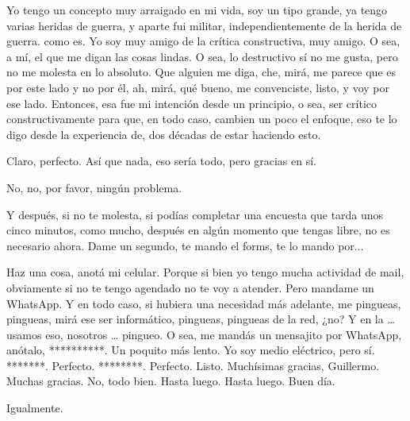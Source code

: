 \begin{description}[leftmargin=0cm, labelsep=0.5cm]
    \item[\textbf{PITA GUILLERMO:}] Yo tengo un concepto muy arraigado en mi vida, soy un tipo grande, ya tengo varias heridas de guerra, y aparte fui militar, independientemente de la herida de guerra. como es. Yo soy muy amigo de la crítica constructiva, muy amigo. O sea, a mí, el que me digan las cosas lindas. O sea, lo destructivo sí no me gusta, pero no me molesta en lo absoluto. Que alguien me diga, che, mirá, me parece que es por este lado y no por él, ah, mirá, qué bueno, me convenciste, listo, y voy por ese lado. Entonces, esa fue mi intención desde un principio, o sea, ser crítico constructivamente para que, en todo caso, cambien un poco el enfoque, eso te lo digo desde la experiencia de, dos décadas de estar haciendo esto.

    \item[\textbf{MUNTAABSKI FEDERICO:}] Claro, perfecto. Así que nada, eso sería todo, pero gracias en sí.

    \item[\textbf{PITA GUILLERMO:}] No, no, por favor, ningún problema.

    \item[\textbf{MUNTAABSKI FEDERICO:}] Y después, si no te molesta, si podías completar una encuesta que tarda unos cinco minutos, como mucho, después en algún momento que tengas libre, no es necesario ahora. Dame un segundo, te mando el forms, te lo mando por...

    \item[\textbf{PITA GUILLERMO:}] Haz una cosa, anotá mi celular. Porque si bien yo tengo mucha actividad de mail, obviamente si no te tengo agendado no te voy a atender. Pero mandame un WhatsApp. Y en todo caso, si hubiera una necesidad más adelante, me pingueas, pingueas, mirá ese ser informático, pingueas, pingueas de la red, ¿no? Y en la … usamos eso, nosotros … pingueo. O sea, me mandás un mensajito por WhatsApp, anótalo, **********. Un poquito más lento. Yo soy medio eléctrico, pero sí. *******. Perfecto. ********. Perfecto. Listo. Muchísimas gracias, Guillermo. Muchas gracias. No, todo bien. Hasta luego. Hasta luego. Buen día.

    \item[\textbf{MOCIULSKY SANTIAGO:}] Igualmente.
\end{description}
